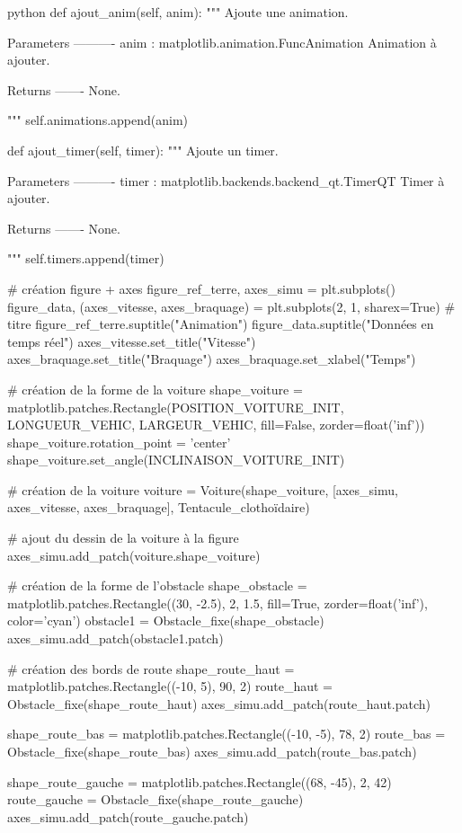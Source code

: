 \begin{mintedbox}{python}
    def ajout_anim(self, anim):
        """
        Ajoute une animation.

        Parameters
        ----------
        anim : matplotlib.animation.FuncAnimation
            Animation à ajouter.

        Returns
        -------
        None.

        """
        self.animations.append(anim)

    def ajout_timer(self, timer):
        """
        Ajoute un timer.

        Parameters
        ----------
        timer : matplotlib.backends.backend_qt.TimerQT
            Timer à ajouter.

        Returns
        -------
        None.

        """
        self.timers.append(timer)


# création figure + axes
figure_ref_terre, axes_simu = plt.subplots()
figure_data, (axes_vitesse, axes_braquage) = plt.subplots(2, 1, sharex=True)
# titre
figure_ref_terre.suptitle("Animation")
figure_data.suptitle("Données en temps réel")
axes_vitesse.set_title("Vitesse")
axes_braquage.set_title("Braquage")
axes_braquage.set_xlabel("Temps")

# création de la forme de la voiture
shape_voiture = matplotlib.patches.Rectangle(POSITION_VOITURE_INIT, LONGUEUR_VEHIC, LARGEUR_VEHIC, fill=False, zorder=float('inf'))
shape_voiture.rotation_point = 'center'
shape_voiture.set_angle(INCLINAISON_VOITURE_INIT)

# création de la voiture
voiture = Voiture(shape_voiture, [axes_simu, axes_vitesse, axes_braquage], Tentacule_clothoïdaire)

# ajout du dessin de la voiture à la figure
axes_simu.add_patch(voiture.shape_voiture)

# création de la forme de l'obstacle
shape_obstacle = matplotlib.patches.Rectangle((30, -2.5), 2, 1.5, fill=True, zorder=float('inf'), color='cyan')
obstacle1 = Obstacle_fixe(shape_obstacle)
axes_simu.add_patch(obstacle1.patch)

# création des bords de route
shape_route_haut = matplotlib.patches.Rectangle((-10, 5), 90, 2)
route_haut = Obstacle_fixe(shape_route_haut)
axes_simu.add_patch(route_haut.patch)

shape_route_bas = matplotlib.patches.Rectangle((-10, -5), 78, 2)
route_bas = Obstacle_fixe(shape_route_bas)
axes_simu.add_patch(route_bas.patch)

shape_route_gauche = matplotlib.patches.Rectangle((68, -45), 2, 42)
route_gauche = Obstacle_fixe(shape_route_gauche)
axes_simu.add_patch(route_gauche.patch)


\end{mintedbox}
